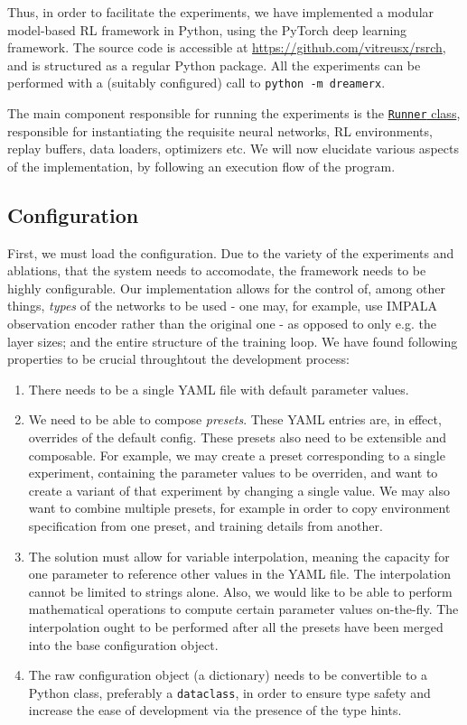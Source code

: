 \documentclass[en]{pracamgr}
\begin{document}
Thus, in order to facilitate the experiments, we have implemented a modular model-based RL framework in Python, using the PyTorch deep learning framework. The source code is accessible at \url{https://github.com/vitreusx/rsrch}, and is structured as a regular Python package. All the experiments can be performed with a (suitably configured) call to {\tt {python -m dreamerx}}.

The main component responsible for running the experiments is the \href{https://github.com/vitreusx/rsrch/blob/devel/dreamerx/runner.py}{{\tt Runner} class}, responsible for instantiating the requisite neural networks, RL environments, replay buffers, data loaders, optimizers etc. We will now elucidate various aspects of the implementation, by following an execution flow of the program.

\subsection{Configuration}

First, we must load the configuration. Due to the variety of the experiments and ablations, that the system needs to accomodate, the framework needs to be highly configurable. Our implementation allows for the control of, among other things, \emph{types} of the networks to be used - one may, for example, use IMPALA observation encoder rather than the original one - as opposed to only e.g. the layer sizes; and the entire structure of the training loop.  We have found following properties to be crucial throughtout the development process:

\begin{enumerate}
  \item There needs to be a single YAML file with default parameter values.
  \item We need to be able to compose \emph{presets}. These YAML entries are, in effect, overrides of the default config. These presets also need to be extensible and composable. For example, we may create a preset corresponding to a single experiment, containing the parameter values to be overriden, and want to create a variant of that experiment by changing a single value. We may also want to combine multiple presets, for example in order to copy environment specification from one preset, and training details from another.
  \item The solution must allow for variable interpolation, meaning the capacity for one parameter to reference other values in the YAML file. The interpolation cannot be limited to strings alone. Also, we would like to be able to perform mathematical operations to compute certain parameter values on-the-fly. The interpolation ought to be performed after all the presets have been merged into the base configuration object.
  \item The raw configuration object (a dictionary) needs to be convertible to a Python class, preferably a {\tt dataclass}, in order to ensure type safety and increase the ease of development via the presence of the type hints.
\end{enumerate}
\end{document}
